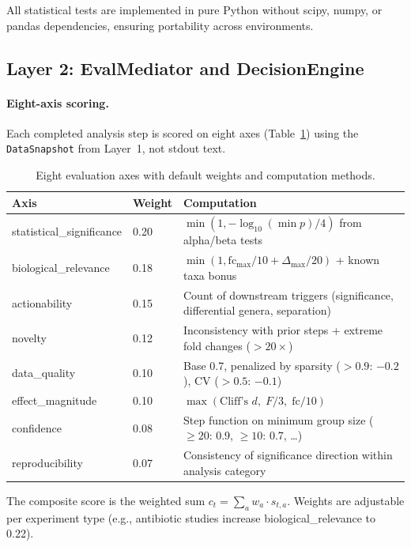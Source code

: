 \documentclass[11pt,a4paper]{article}
\begin{document}
All statistical tests are implemented in pure Python without scipy,
numpy, or pandas dependencies, ensuring portability across environments.

\subsection{Layer 2: EvalMediator and DecisionEngine}

\paragraph{Eight-axis scoring.}
Each completed analysis step is scored on eight axes (Table~\ref{tab:axes})
using the \texttt{DataSnapshot} from Layer~1, not stdout text.

\begin{table}[t]
\centering
\caption{Eight evaluation axes with default weights and computation methods.}
\label{tab:axes}
\small
\begin{tabular}{@{}llp{7.5cm}@{}}
\toprule
\textbf{Axis} & \textbf{Weight} & \textbf{Computation} \\
\midrule
statistical\_significance & 0.20 &
  $\min(1, -\log_{10}(\min p) / 4)$ from alpha/beta tests \\
biological\_relevance & 0.18 &
  $\min(1, \mathrm{fc}_{\max}/10 + \Delta_{\max}/20)$ + known taxa bonus \\
actionability & 0.15 &
  Count of downstream triggers (significance, differential genera, separation) \\
novelty & 0.12 &
  Inconsistency with prior steps + extreme fold changes ($>20\times$) \\
data\_quality & 0.10 &
  Base 0.7, penalized by sparsity ($>0.9$: $-0.2$), CV ($>0.5$: $-0.1$) \\
effect\_magnitude & 0.10 &
  $\max(\text{Cliff's } d, \; F/3, \; \mathrm{fc}/10)$ \\
confidence & 0.08 &
  Step function on minimum group size ($\geq 20$: 0.9, $\geq 10$: 0.7, \ldots) \\
reproducibility & 0.07 &
  Consistency of significance direction within analysis category \\
\bottomrule
\end{tabular}
\end{table}

The composite score is the weighted sum
$c_t = \sum_{a} w_a \cdot s_{t,a}$.
Weights are adjustable per experiment type (e.g., antibiotic studies
increase biological\_relevance to 0.22).
\end{document}
